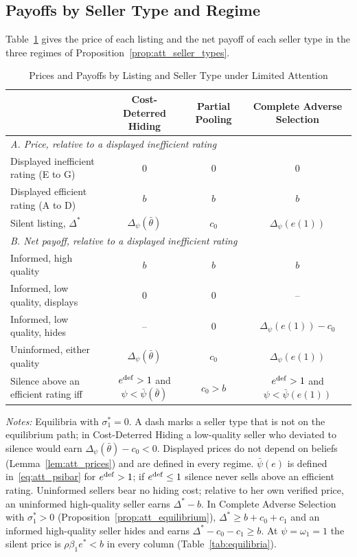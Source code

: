\subsection*{Payoffs by Seller Type and Regime}
\label{app:att_payoffs}

Table~\ref{tab:att_seller_types} gives the price of each listing and the net payoff of each seller type in the three regimes of Proposition~\ref{prop:att_seller_types}.

\begin{table}[htbp]
\centering
\caption{Prices and Payoffs by Listing and Seller Type under Limited Attention}
\label{tab:att_seller_types}
\small\renewcommand{\arraystretch}{1.5}
\begin{tabular*}{\textwidth}{@{\extracolsep{\fill}}lccc@{}}
\toprule\toprule
 & \textbf{Cost-Deterred Hiding} & \textbf{Partial Pooling} & \textbf{Complete Adverse Selection} \\
\midrule
\multicolumn{4}{l}{\textit{A. Price, relative to a displayed inefficient rating}} \\
Displayed inefficient rating (E to G) & $0$ & $0$ & $0$ \\
Displayed efficient rating (A to D) & $b$ & $b$ & $b$ \\
Silent listing, $\Delta^*$ & $\Delta_\psi(\bar\theta)$ & $c_0$ & $\Delta_\psi(e(1))$ \\
\midrule
\multicolumn{4}{l}{\textit{B. Net payoff, relative to a displayed inefficient rating}} \\
Informed, high quality & $b$ & $b$ & $b$ \\
Informed, low quality, displays & $0$ & $0$ & -- \\
Informed, low quality, hides & -- & $0$ & $\Delta_\psi(e(1))-c_0$ \\
Uninformed, either quality & $\Delta_\psi(\bar\theta)$ & $c_0$ & $\Delta_\psi(e(1))$ \\
\midrule
Silence above an efficient rating iff & $e^{\rm def}>1$ and $\psi<\bar\psi(\bar\theta)$ & $c_0>b$ & $e^{\rm def}>1$ and $\psi<\bar\psi(e(1))$ \\
\bottomrule\bottomrule
\end{tabular*}

\vspace{0.5em}
\raggedright
\footnotesize
\textit{Notes:} Equilibria with $\sigma_1^*=0$. A dash marks a seller type that is not on the equilibrium path; in Cost-Deterred Hiding a low-quality seller who deviated to silence would earn $\Delta_\psi(\bar\theta)-c_0<0$. Displayed prices do not depend on beliefs (Lemma~\ref{lem:att_prices}) and are defined in every regime. $\bar\psi(e)$ is defined in~\eqref{eq:att_psibar} for $e^{\rm def}>1$; if $e^{\rm def}\le1$ silence never sells above an efficient rating. Uninformed sellers bear no hiding cost; relative to her own verified price, an uninformed high-quality seller earns $\Delta^*-b$. In Complete Adverse Selection with $\sigma_1^*>0$ (Proposition~\ref{prop:att_equilibrium}), $\Delta^*\ge b+c_0+c_1$ and an informed high-quality seller hides and earns $\Delta^*-c_0-c_1\ge b$. At $\psi=\omega_1=1$ the silent price is $\rho\beta_1e^*<b$ in every column (Table~\ref{tab:equilibria}).
\end{table}

